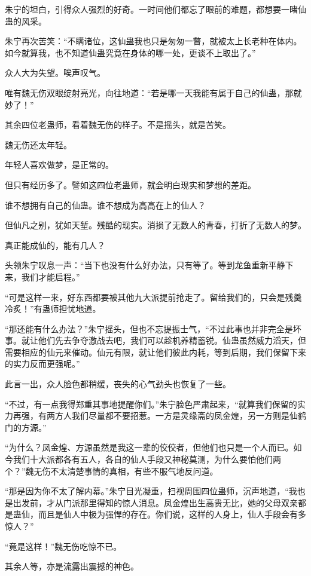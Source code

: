 \begin{this_body}
朱宁的坦白，引得众人强烈的好奇。一时间他们都忘了眼前的难题，都想要一睹仙蛊的风采。

朱宁再次苦笑：“不瞒诸位，这仙蛊我也只是匆匆一瞥，就被太上长老种在体内。如今就算我，也不知道仙蛊究竟在身体的哪一处，更谈不上取出了。”

众人大为失望。唉声叹气。

唯有魏无伤双眼绽射亮光，向往地道：“若是哪一天我能有属于自己的仙蛊，那就妙了！”

其余四位老蛊师，看着魏无伤的样子。不是摇头，就是苦笑。

魏无伤还太年轻。

年轻人喜欢做梦，是正常的。

但只有经历多了。譬如这四位老蛊师，就会明白现实和梦想的差距。

谁不想拥有自己的仙蛊。谁不想成为高高在上的仙人？

但仙凡之别，犹如天堑。残酷的现实。消损了无数人的青春，打折了无数人的梦。

真正能成仙的，能有几人？

头领朱宁叹息一声：“当下也没有什么好办法，只有等了。等到龙鱼重新平静下来，我们才能启程。”

“可是这样一来，好东西都要被其他九大派提前抢走了。留给我们的，只会是残羹冷炙！”有蛊师担忧地道。

“那还能有什么办法？”朱宁摇头，但也不忘提振士气，“不过此事也并非完全是坏事。就让他们先去争夺激战去吧，我们可以趁机养精蓄锐。仙蛊虽然威力滔天，但需要相应的仙元来催动。仙元有限，就让他们彼此内耗，等到后期，我们保留下来的实力反而更强呢。”

此言一出，众人脸色都稍缓，丧失的心气劲头也恢复了一些。

“不过，有一点我得郑重其事地提醒你们。”朱宁脸色严肃起来，“就算我们保留的实力再强，有两方人我们尽量都不要招惹。一方是灵缘斋的凤金煌，另一方则是仙鹤门的方源。”

“为什么？凤金煌、方源虽然是我这一辈的佼佼者，但他们也只是一个人而已。如今我们十大派都各有五人，各自的仙人手段又神秘莫测，为什么要怕他们两个？”魏无伤不太清楚事情的真相，有些不服气地反问道。

“那是因为你不太了解内幕。”朱宁目光凝重，扫视周围四位蛊师，沉声地道，“我也是出发前，才从门派那里得知的惊人消息。凤金煌出生高贵无比，她的父母双亲都是蛊仙，而且是仙人中极为强悍的存在。你们说，这样的人身上，仙人手段会有多惊人？”

“竟是这样！”魏无伤吃惊不已。

其余人等，亦是流露出震撼的神色。


\end{this_body}

